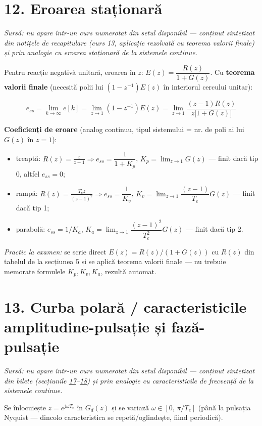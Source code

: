 \documentclass[10pt,a4paper]{article}
\newcommand{\srcnote}[1]{{\footnotesize\color{gray!55!black}\textit{Sursă: #1}}\par}
\begin{document}
\section*{12. Eroarea staționară}\label{sec:12}
\srcnote{nu apare într-un curs numerotat din setul disponibil — conținut sintetizat din notițele de recapitulare (curs 13, aplicație rezolvată cu teorema valorii finale) și prin analogie cu eroarea staționară de la sistemele continue.}
Pentru reacție negativă unitară, eroarea în $z$: $E(z)=\dfrac{R(z)}{1+G(z)}$. Cu \textbf{teorema valorii finale} (necesită polii lui $(1-z^{-1})E(z)$ în interiorul cercului unitar):
\begin{keyeq}\color{red!65!black}
$$e_{ss}=\lim_{k\to\infty}e[k]=\lim_{z\to1}(1-z^{-1})E(z)=\lim_{z\to1}\dfrac{(z-1)R(z)}{z\big[1+G(z)\big]}$$
\end{keyeq}
\textbf{Coeficienți de eroare} (analog continuu, tipul sistemului = nr. de poli ai lui $G(z)$ în $z{=}1$):
\begin{itemize}
\item treaptă: $R(z)=\frac{z}{z-1}\Rightarrow e_{ss}=\dfrac{1}{1+K_p}$, $K_p=\lim_{z\to1}G(z)$ — finit dacă tip 0, altfel $e_{ss}=0$;
\item rampă: $R(z)=\frac{T_ez}{(z-1)^2}\Rightarrow e_{ss}=\dfrac{1}{K_v}$, $K_v=\lim_{z\to1}\dfrac{(z-1)}{T_e}G(z)$ — finit dacă tip 1;
\item parabolă: $e_{ss}=1/K_a$, $K_a=\lim_{z\to1}\dfrac{(z-1)^2}{T_e^2}G(z)$ — finit dacă tip 2.
\end{itemize}
\textit{Practic la examen:} se scrie direct $E(z)=R(z)/(1+G(z))$ cu $R(z)$ din tabelul de la secțiunea 5 și se aplică teorema valorii finale — nu trebuie memorate formulele $K_p,K_v,K_a$, rezultă automat.

\section*{13. Curba polară / caracteristicile amplitudine-pulsație și fază-pulsație}\label{sec:13}
\srcnote{nu apare într-un curs numerotat din setul disponibil — conținut sintetizat din bilete (secțiunile \hyperref[sec:17]{17}–\hyperref[sec:18]{18}) și prin analogie cu caracteristicile de frecvență de la sistemele continue.}
Se înlocuiește $z=e^{j\omega T_e}$ în $G_d(z)$ și se variază $\omega\in[0,\,\pi/T_e]$ (până la pulsația Nyquist — dincolo caracteristica se repetă/oglindește, fiind periodică).
\end{document}
